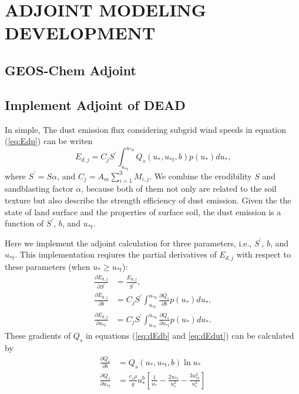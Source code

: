 \chapter{ADJOINT MODELING DEVELOPMENT}

\section{GEOS-Chem Adjoint}
\section{Implement Adjoint of DEAD}

   In simple, The dust emission flux considering subgrid wind speeds in equation 
   (\ref{eq:Edp}) can be writen
   \begin{equation}
   E_{d,j} = C_j S^\prime \int^{u_{*u}}_{u_{*t}} Q_s(u_*,u_{*t},b) p(u_*) d u_* \mbox{,}
   \end{equation}
   where $S^\prime = S \alpha$, and $C_j=A_m \displaystyle \sum_{i=1}^3 M_{i,j}$. We combine
   the erodibility $S$ and sandblasting factor $\alpha$, because both of them not only are 
   related to the soil texture but also describe the strength efficiency of dust emission. 
   Given the the state of land surface and the properties of surface soil, the dust emission
   is a function of $S^\prime$, $b$, and $u_{*t}$. 

   Here we implement the adjoint calculation for three parameters, i.e., 
   $S^\prime$, $b$, and $u_{*t}$. This implementation reqiures the partial
   derivatives of $E_{d,j}$ with respect to these parameters (when 
   $u_* \geq u_{*t}$): 
   \begingroup
   \allowdisplaybreaks
   \begin{align}
     \frac{\partial E_{d,j}}{\partial S^\prime} 
       &= \frac{E_{d,j}}{S^\prime}\mbox{,} \\
     \frac{\partial E_{d,j}}{\partial b} 
       &= C_j S^\prime \int^{u_{*u}}_{u_{*t}} 
          \frac{\partial Q_s}{\partial b} p(u_*) d u_* \mbox{,} \label{eq:dEdb}\\
     \frac{\partial E_{d,j}}{\partial u_{*t}}
       & = C_j S^\prime \int^{u_{*u}}_{u_{*t}} 
          \frac{\partial Q_s}{\partial u_{*t}} p(u_*) d u_* \mbox{.} \label{eq:dEdut}
   \end{align}
   \endgroup
   These gradients of $Q_s$ in equations (\ref{eq:dEdb} and \ref{eq:dEdut}) can be 
   calculated by
   \begingroup
   \allowdisplaybreaks
   \begin{align}
   \frac{\partial Q_s}{\partial b} &= Q_s(u_*,u_{*t},b) \ln{u_*} \\
   \frac{\partial Q_s}{\partial u_{*t}} &=\frac{c_s \rho}{g} u_*^b
         \left[\frac{1}{u_*} - \frac{2u_{*t}}{u_*^2} 
         - \frac{3u_{*t}^2}{u_*^3}\right] 
   \end{align}
   \endgroup
